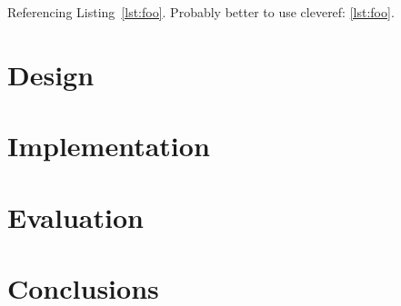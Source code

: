 \documentclass[11pt,titlepage,openright]{book}
\begin{document}
Referencing Listing~\ref{lst:foo}.
Probably better to use cleveref: \cref{lst:foo}.

\chapter{Design}
\lipsum

\chapter{Implementation}
\lipsum

\chapter{Evaluation}
\lipsum

\chapter{Conclusions}
\lipsum



\end{document}
